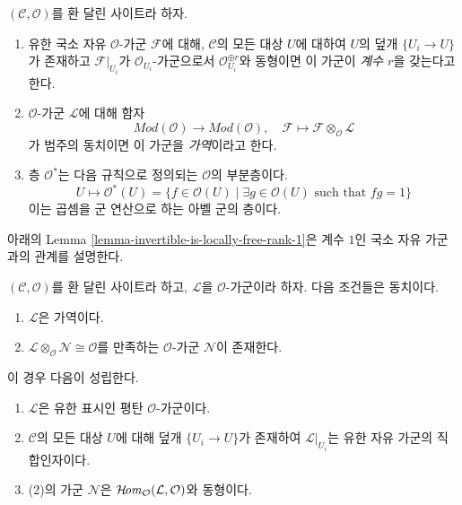 \begin{definition}
\label{definition-invertible-sheaf}
$(\mathcal{C}, \mathcal{O})$를 환 달린 사이트라 하자.
\begin{enumerate}
\item 유한 국소 자유 $\mathcal{O}$-가군 $\mathcal{F}$에 대해,
$\mathcal{C}$의 모든 대상 $U$에 대하여 $U$의 덮개 $\{U_i \to U\}$가
존재하고 $\mathcal{F}|_{U_i}$가 $\mathcal{O}_{U_i}$-가군으로서
$\mathcal{O}_{U_i}^{\oplus r}$와 동형이면 이 가군이 {\it 계수 $r$}을
갖는다고 한다.
\item $\mathcal{O}$-가군 $\mathcal{L}$에 대해 함자
$$
\textit{Mod}(\mathcal{O}) \longrightarrow \textit{Mod}(\mathcal{O}),\quad
\mathcal{F}  \longmapsto \mathcal{F} \otimes_\mathcal{O} \mathcal{L}
$$
가 범주의 동치이면 이 가군을 {\it 가역}이라고 한다.
\item 층 {\it $\mathcal{O}^*$}는 다음 규칙으로 정의되는 $\mathcal{O}$의
부분층이다.
$$
U \longmapsto \mathcal{O}^*(U) = \{f \in \mathcal{O}(U) \mid
\exists g \in \mathcal{O}(U)\text{ such that }fg = 1\}
$$
이는 곱셈을 군 연산으로 하는 아벨 군의 층이다.
\end{enumerate}
\end{definition}

\noindent
아래의 Lemma \ref{lemma-invertible-is-locally-free-rank-1}은 계수 $1$인
국소 자유 가군과의 관계를 설명한다.

\begin{lemma}
\label{lemma-invertible}
$(\mathcal{C}, \mathcal{O})$를 환 달린 사이트라 하고, $\mathcal{L}$을
$\mathcal{O}$-가군이라 하자. 다음 조건들은 동치이다.
\begin{enumerate}
\item $\mathcal{L}$은 가역이다.
\item $\mathcal{L} \otimes_\mathcal{O} \mathcal{N} \cong \mathcal{O}$를
만족하는 $\mathcal{O}$-가군 $\mathcal{N}$이 존재한다.
\end{enumerate}
이 경우 다음이 성립한다.
\begin{enumerate}
\item[(a)] $\mathcal{L}$은 유한 표시인 평탄 $\mathcal{O}$-가군이다.
\item[(b)] $\mathcal{C}$의 모든 대상 $U$에 대해 덮개 $\{U_i \to U\}$가
존재하여 $\mathcal{L}|_{U_i}$는 유한 자유 가군의 직합인자이다.
\item[(c)] (2)의 가군 $\mathcal{N}$은
$\mathop{\mathcal{H}\!\mathit{om}}\nolimits_\mathcal{O}(\mathcal{L}, \mathcal{O})$와 동형이다.
\end{enumerate}
\end{lemma}

